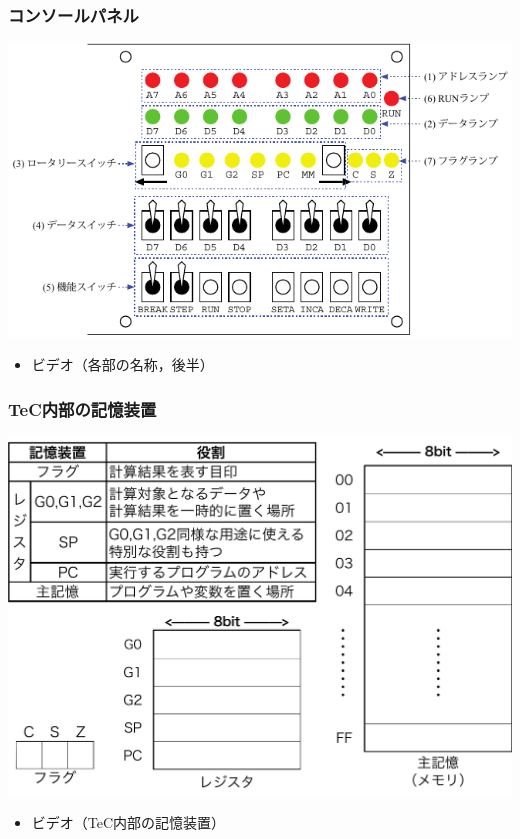 \documentclass[handout]{beamer}         %
\begin{document}
\begin{frame}
  \frametitle{コンソールパネル}
  \vfill
  \centerline{\includegraphics[scale=1.0]{../chap4/console.pdf}}
  \vfill
  \begin{itemize}
    \item ビデオ（各部の名称，後半）
  \end{itemize}
  \vfill
\end{frame}

\begin{frame}
  \frametitle{TeC内部の記憶装置}
  \vfill
  \centerline{\includegraphics[scale=0.2]{../Keynote/naibu-crop.pdf}}
  \vfill
  \begin{itemize}
    \item ビデオ（TeC内部の記憶装置）
  \end{itemize}
  \vfill
\end{frame}
\end{document}
